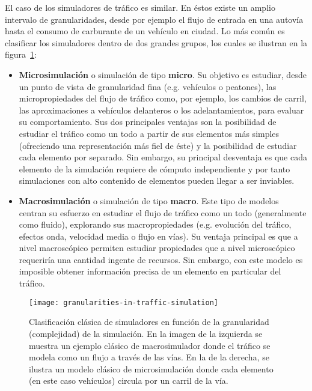 El caso de los simuladores de tráfico es similar. En éstos existe un amplio intervalo de granularidades, desde por ejemplo el flujo de entrada en una autovía hasta el consumo de carburante de un vehículo en ciudad. Lo más común es clasificar los simuladores dentro de dos grandes grupos, los cuales se ilustran en la figura~\ref{fig:granularities-in-traffic-simulation}:

\begin{itemize}
	\item \textbf{Microsimulación} o simulación de tipo \textbf{micro}. Su objetivo es estudiar, desde un punto de vista de granularidad fina (e.g. vehículos o peatones), las micropropiedades del flujo de tráfico como, por ejemplo, los cambios de carril, las aproximaciones a vehículos delanteros o los adelantamientos, para evaluar su comportamiento. Sus dos principales ventajas son la posibilidad de estudiar el tráfico como un todo a partir de sus elementos más simples (ofreciendo una representación más fiel de éste) y la posibilidad de estudiar cada elemento por separado. Sin embargo, su principal desventaja es que cada elemento de la simulación requiere de cómputo independiente y por tanto simulaciones con alto contenido de elementos pueden llegar a ser inviables.
	\item \textbf{Macrosimulación} o simulación de tipo \textbf{macro}. Este tipo de modelos centran su esfuerzo en estudiar el flujo de tráfico como un todo (generalmente como fluido), explorando sus macropropiedades (e.g. evolución del tráfico, efectos onda, velocidad media o flujo en vías). Su ventaja principal es que a nivel macroscópico permiten estudiar propiedades que a nivel microscópico requeriría una cantidad ingente de recursos. Sin embargo, con este modelo es imposible obtener información precisa de un elemento en particular del tráfico.
\end{itemize}

\begin{figure}
	\centering
	\texttt{[image: granularities-in-traffic-simulation]}
	\caption[Clasificación de simuladores según granularidad]{Clasificación clásica de simuladores en función de la granularidad (complejidad) de la simulación. En la imagen de la izquierda se muestra un ejemplo clásico de macrosimulador donde el tráfico se modela como un flujo a través de las vías. En la de la derecha, se ilustra un modelo clásico de microsimulación donde cada elemento (en este caso vehículos) circula por un carril de la vía.}
	\label{fig:granularities-in-traffic-simulation}
\end{figure}

